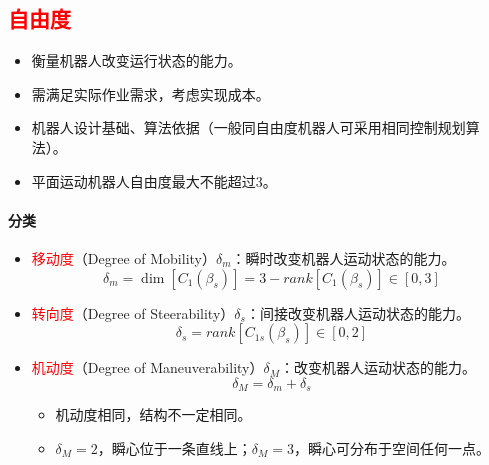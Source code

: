 \documentclass[
12pt, %
a4paper, 
oneside, %
]{scrartcl}
\begin{document}
\subsection[自由度]{\textcolor{red}{自由度}}
\begin{itemize}
\item 衡量机器人改变运行状态的能力。
\item 需满足实际作业需求，考虑实现成本。
\item 机器人设计基础、算法依据（一般同自由度机器人可采用相同控制规划算法）。
\item 平面运动机器人自由度最大不能超过$ 3 $。
\end{itemize}
\paragraph{分类}
\begin{itemize}
\item \textcolor{red}{移动度}（Degree of Mobility）$ \delta_m $：瞬时改变机器人运动状态的能力。
$$ \delta_m = \dim[C_1(\beta_s)] = 3 - rank[C_1(\beta_s)] \in [0, 3] $$
\item \textcolor{red}{转向度}（Degree of Steerability）$ \delta_s $：间接改变机器人运动状态的能力。
$$ \delta_s = rank[C_{1s}(\beta_s)] \in [0, 2] $$
\item \textcolor{red}{机动度}（Degree of Maneuverability）$ \delta_M $：改变机器人运动状态的能力。
$$ \delta_M = \delta_m + \delta_s $$
\begin{itemize}
\item 机动度相同，结构不一定相同。
\item $ \delta_M = 2 $，瞬心位于一条直线上；$ \delta_M = 3 $，瞬心可分布于空间任何一点。
\end{itemize}
\end{itemize}
\end{document}
